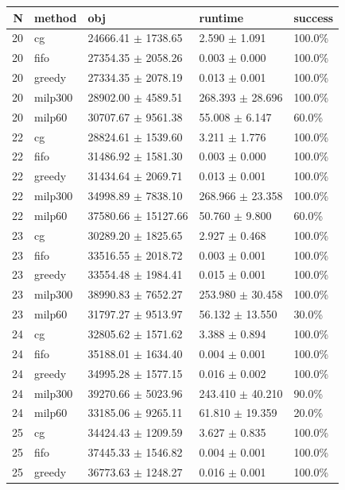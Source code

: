 \begin{tabular}{rllll}
\toprule
N & method & obj & runtime & success \\
\midrule
20 & cg & 24666.41 $\pm$ 1738.65 & 2.590 $\pm$ 1.091 & 100.0\% \\
20 & fifo & 27354.35 $\pm$ 2058.26 & 0.003 $\pm$ 0.000 & 100.0\% \\
20 & greedy & 27334.35 $\pm$ 2078.19 & 0.013 $\pm$ 0.001 & 100.0\% \\
20 & milp300 & 28902.00 $\pm$ 4589.51 & 268.393 $\pm$ 28.696 & 100.0\% \\
20 & milp60 & 30707.67 $\pm$ 9561.38 & 55.008 $\pm$ 6.147 & 60.0\% \\
22 & cg & 28824.61 $\pm$ 1539.60 & 3.211 $\pm$ 1.776 & 100.0\% \\
22 & fifo & 31486.92 $\pm$ 1581.30 & 0.003 $\pm$ 0.000 & 100.0\% \\
22 & greedy & 31434.64 $\pm$ 2069.71 & 0.013 $\pm$ 0.001 & 100.0\% \\
22 & milp300 & 34998.89 $\pm$ 7838.10 & 268.966 $\pm$ 23.358 & 100.0\% \\
22 & milp60 & 37580.66 $\pm$ 15127.66 & 50.760 $\pm$ 9.800 & 60.0\% \\
23 & cg & 30289.20 $\pm$ 1825.65 & 2.927 $\pm$ 0.468 & 100.0\% \\
23 & fifo & 33516.55 $\pm$ 2018.72 & 0.003 $\pm$ 0.001 & 100.0\% \\
23 & greedy & 33554.48 $\pm$ 1984.41 & 0.015 $\pm$ 0.001 & 100.0\% \\
23 & milp300 & 38990.83 $\pm$ 7652.27 & 253.980 $\pm$ 30.458 & 100.0\% \\
23 & milp60 & 31797.27 $\pm$ 9513.97 & 56.132 $\pm$ 13.550 & 30.0\% \\
24 & cg & 32805.62 $\pm$ 1571.62 & 3.388 $\pm$ 0.894 & 100.0\% \\
24 & fifo & 35188.01 $\pm$ 1634.40 & 0.004 $\pm$ 0.001 & 100.0\% \\
24 & greedy & 34995.28 $\pm$ 1577.15 & 0.016 $\pm$ 0.002 & 100.0\% \\
24 & milp300 & 39270.66 $\pm$ 5023.96 & 243.410 $\pm$ 40.210 & 90.0\% \\
24 & milp60 & 33185.06 $\pm$ 9265.11 & 61.810 $\pm$ 19.359 & 20.0\% \\
25 & cg & 34424.43 $\pm$ 1209.59 & 3.627 $\pm$ 0.835 & 100.0\% \\
25 & fifo & 37445.33 $\pm$ 1546.82 & 0.004 $\pm$ 0.001 & 100.0\% \\
25 & greedy & 36773.63 $\pm$ 1248.27 & 0.016 $\pm$ 0.001 & 100.0\% \\

\end{tabular}
